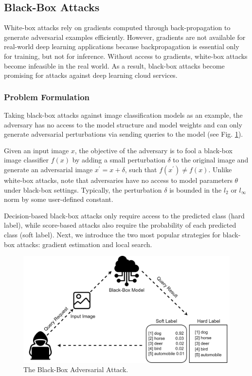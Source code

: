 
\subsection{Black-Box Attacks}
\label{sec:blackbox_attack}

White-box attacks rely on gradients computed through back-propagation to generate adversarial examples efficiently. However, gradients are not available for real-world deep learning applications because backpropagation is essential only for training, but not for inference. Without access to gradients, white-box attacks become infeasible in the real world. As a result, black-box attacks become promising for attacks against deep learning cloud services.

\subsubsection{Problem Formulation}

Taking black-box attacks against image classification models as an example, the adversary has no access to the model structure and model weights and can only generate adversarial perturbations via sending queries to the model (see Fig. \ref{fig.decision}).
 
Given an input image $x$, the objective of the adversary is to fool a black-box image classifier $f(x)$ by adding a small perturbation $\delta$ to the original image and generate an adversarial image $x^{'} = x + \delta$, such that $f(x^{'}) \neq f(x)$. Unlike white-box attacks, note that adversaries have no access to model parameters $\theta$ under black-box settings. Typically, the perturbation $\delta$ is bounded in the $l_2$ or $l_{\infty}$ norm by some user-defined constant.

Decision-based black-box attacks only require access to the predicted class (hard label), while score-based attacks also require the probability of each predicted class (soft label).  Next, we introduce the two most popular strategies for black-box attacks: gradient estimation and local search.

\begin{figure}[H]
\centering
\includegraphics[width=\textwidth]{figures/chapter_intro/black-box.jpg}
\caption{The Black-Box Adversarial Attack.}
\label{fig.decision}
\end{figure}

